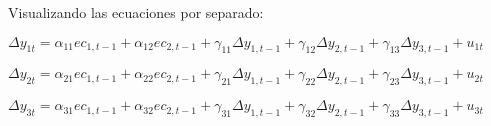 \documentclass[10pt, a4paper, landscape]{article}
\begin{document}
\begin{multicols}{2}
Visualizando las ecuaciones por separado:

\begin{center}
	\( \Delta y_{1t} = \alpha_{11} ec_{1, t - 1} + \alpha_{12} ec_{2, t - 1}  + \gamma_{11} \Delta y_{1, t - 1} + \gamma_{12} \Delta y_{2, t - 1} + \gamma_{13} \Delta y_{3, t - 1} + u_{1t} \)

	\( \Delta y_{2t} = \alpha_{21} ec_{1, t - 1} + \alpha_{22} ec_{2, t - 1}  + \gamma_{21} \Delta y_{1, t - 1} + \gamma_{22} \Delta y_{2, t - 1} + \gamma_{23} \Delta y_{3, t - 1} + u_{2t} \)

	\( \Delta y_{3t} = \alpha_{31} ec_{1, t - 1} + \alpha_{32} ec_{2, t - 1}  + \gamma_{31} \Delta y_{1, t - 1} + \gamma_{32} \Delta y_{2, t - 1} + \gamma_{33} \Delta y_{3, t - 1} + u_{3t} \)
\end{center}

\end{multicols}
\end{document}
